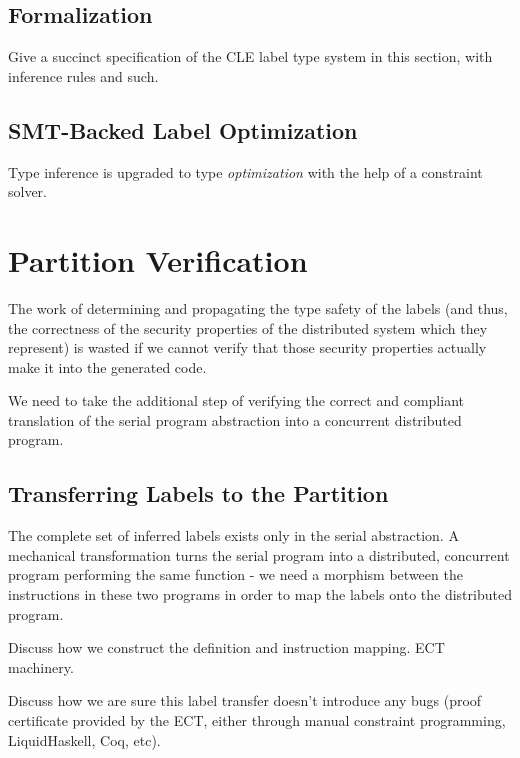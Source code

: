 \documentclass[conference,compsoc]{IEEEtran}
\begin{document}
    \subsection{Formalization}

        Give a succinct specification of the CLE label type system in
        this section, with inference rules and such.

    \subsection{SMT-Backed Label Optimization}

        Type inference is upgraded to type \textit{optimization} with
        the help of a constraint solver.

\section{Partition Verification}

    The work of determining and propagating the type safety of the labels (and
    thus, the correctness of the security properties of the distributed system
    which they represent) is wasted if we cannot verify that those security
    properties actually make it into the generated code.

    We need to take the additional step of verifying the correct and compliant
    translation of the serial program abstraction into a concurrent distributed
    program.

    \subsection{Transferring Labels to the Partition}

        The complete set of inferred labels exists only in the serial
        abstraction. A mechanical transformation turns the serial program into
        a distributed, concurrent program performing the same function - we need
        a morphism between the instructions in these two programs in order
        to map the labels onto the distributed program.

        Discuss how we construct the definition and instruction mapping. ECT
        machinery.

        Discuss how we are sure this label transfer doesn't introduce any
        bugs (proof certificate provided by the ECT, either through manual
        constraint programming, LiquidHaskell, Coq, etc).
\end{document}
